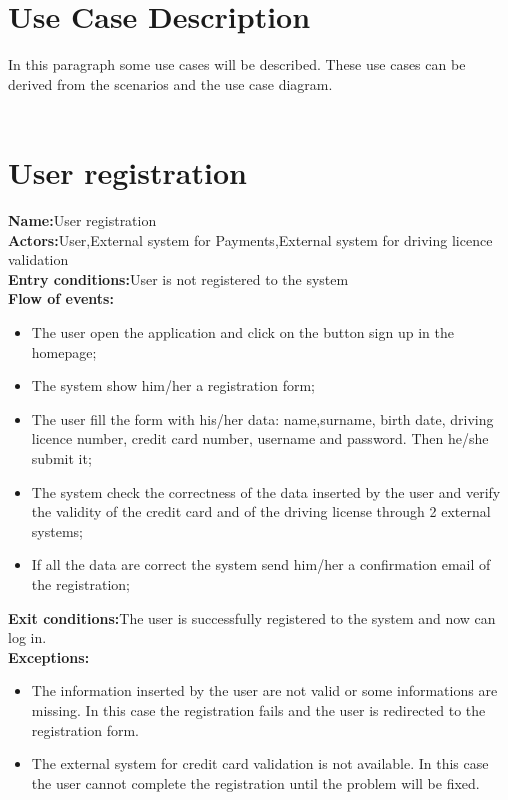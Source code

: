 \section{Use Case Description}
In this paragraph some use cases will be described. These use cases can be derived from the scenarios and the use case diagram.\\
\\
\section*{User registration} 
\textbf{Name:}User registration \\
\textbf{Actors:}User,External system for Payments,External system for driving licence validation\\
\textbf{Entry conditions:}User is not registered to the system \\
\textbf{Flow of events:} \\
\begin{itemize}
\item The user open the application and click on the button sign up in the homepage;
\item The system show him/her a registration form;
\item The user fill the form with his/her data: name,surname, birth date, driving licence number, credit card number, username and password. Then he/she submit it;
\item The system check the correctness of the data inserted by the user and verify the validity of the credit card and of the driving license through 2 external systems;
\item If all the data are correct the system send him/her a confirmation email of the registration;
\end{itemize}
\textbf{Exit conditions:}The user is successfully registered to the system and now can log in.\\
\textbf{Exceptions:}
\begin{itemize}
\item The information inserted by the user are not valid or some informations are missing.
In this case the registration fails and the user is redirected to the registration form.
\item The external system for credit card validation is not available. In this case the user cannot complete the registration until the problem will be fixed.
\end{itemize}


